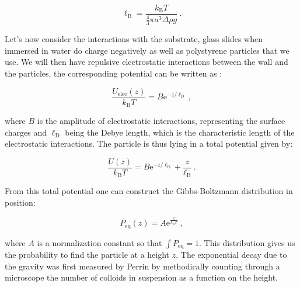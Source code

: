 \begin{equation}
	\ell_\mathrm{B} = \frac{k_\mathrm{B} T}{ \frac{4}{3} \pi a^3 \Delta \rho g}~.
\end{equation}

Let's now consider the interactions with the substrate, glass slides when immersed in water do charge negatively as well as polystyrene particles that we use. We will then have repulsive electrostatic interactions between the wall and the particles, the corresponding potential can be written as  \cite{israelachvili_intermolecular_2015}:

\begin{equation}
	\frac{U_\mathrm{elec}(z)}{k_\mathrm{B}T} = B \mathrm{e}^{-z/\ell_\mathrm{D}}~,
\end{equation}


where $B$ is the amplitude of electrostatic interactions, representing the surface charges and $\ell_\mathrm{D}$ being the Debye length, which is the characteristic length of the electrostatic interactions. The particle is thus lying in a total potential given by:

\begin{equation}
	\frac{U(z)}{k_\mathrm{B}T} =   B \mathrm{e}^{-z/\ell_\mathrm{D}} +  \frac{z}{\ell_\mathrm{B}}~.
\end{equation}

From this total potential one can construct the Gibbs-Boltzmann distribution in position:

\begin{equation}
	P_\mathrm{eq}(z) = A\mathrm{e}^
	{
		\frac{U}{k_\mathrm{B}T}	
	}~,
	\label{Eq:Peq}
\end{equation}

where $A$ is a normalization constant so that $\int P_\mathrm{eq} = 1$. This distribution gives us the probability to find the particle at a height $z$. The exponential decay due to the gravity was first measured by Perrin \cite{perrin_les_2014} by methodically counting through a microscope the number of colloids in suspension as a function on the height. 


